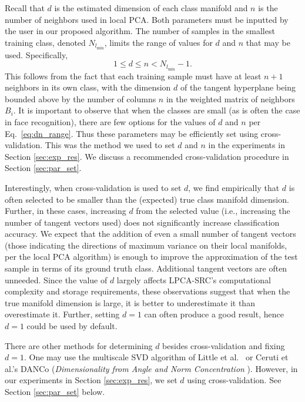 \documentclass[review]{elsarticle}
\begin{document}
Recall that $d$ is the estimated dimension of each class manifold and $n$ is the number of neighbors used in local PCA. Both parameters must be inputted by the user in our proposed algorithm. The number of samples in the smallest training class, denoted $N_{l_\mathrm{min}}$, limits the range of values for $d$ and $n$ that may be used. Specifically, 
\begin{equation} \label{eq:dn_range}
1 \leq d \leq n < N_{l_\mathrm{min}}-1. 
\end{equation}
This follows from the fact that each training sample must have at least $n+1$ neighbors in its own class, with the dimension $d$ of the tangent hyperplane being bounded above by the number of columns $n$ in the weighted matrix of neighbors $B_i$. It is important to observe that when the classes are small (as is often the case in face recognition), there are few options for the values of $d$ and $n$ per Eq.~\eqref{eq:dn_range}. Thus these parameters may be efficiently set using cross-validation. This was the method we used to set $d$ and $n$ in the experiments in Section \ref{sec:exp_res}. We discuss a recommended cross-validation procedure in Section \ref{sec:par_set}.

\begin{rem} \label{rem:d}
Interestingly, when cross-validation is used to set $d$, we find empirically that $d$ is often selected to be smaller than the (expected) true class manifold dimension. Further, in these cases, increasing $d$ from the selected value (i.e., increasing the number of tangent vectors used) does not significantly increase classification accuracy. We expect that the addition of even a small number of tangent vectors (those indicating the directions of maximum variance on their local manifolds, per the local PCA algorithm) is enough to improve the approximation of the test sample in terms of its ground truth class. Additional tangent vectors are often unneeded. Since the value of $d$ largely affects LPCA-SRC's computational complexity and storage requirements, these observations suggest that when the true manifold dimension is large, it is better to underestimate it than overestimate it. Further, setting $d=1$ can often produce a good result, hence $d=1$ could be used by default.


There are other methods for determining $d$ besides cross-validation and fixing $d=1$. One may use the multiscale SVD algorithm of Little et al.\ \cite{mag:msvd} or Ceruti et al.'s DANCo (\emph{Dimensionality from Angle and Norm Concentration} \cite{cer:dan}). However, in our experiments in Section \ref{sec:exp_res}, we set $d$ using cross-validation. See Section \ref{sec:par_set} below.
\end{rem}
\end{document}
